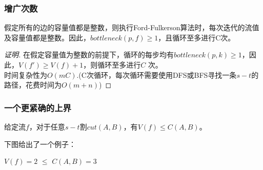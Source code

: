  \subsubsection{增广次数}
 \begin{theorem}
   假定所有的边的容量值都是整数，则执行Ford-Fulkerson算法时，每次迭代的流值及容量值都是整数。因此，$bottleneck(p,f)\geq 1$，且循环至多进行C次。
 \end{theorem}
 \begin{proof}[证明]
 在假定容量值为整数的前提下，循环的每步均有$bottleneck(p,k)\geq 1$，因此，$V(f')\geq V(f)+1$，则循环至多进行$C$ 次。\\
  时间复杂性为$O(mC)$.(C次循环，每次循环需要使用DFS或BFS寻找一条$s-t$的路径，花费时间为$O(m+n)$)
 \end{proof}
\subsubsection{一个更紧确的上界}
\begin{theorem}[紧确的上界]
  给定流$f$，对于任意$s-t$割$cut(A,B)$，有$V(f)\leq C(A,B)$。
\end{theorem}
下图给出了一个例子：
  \begin{figure}[h]
  \center
\end{figure}

\begin{centering}
\hspace{7cm}$V(f)=2$ $\leq$   $C(A, B) = 3$
\end{centering}

